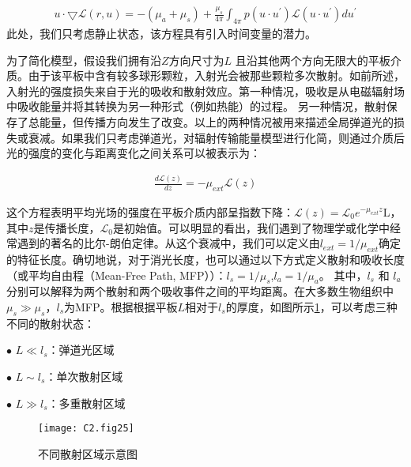 \begin{equation}
\begin{aligned}
    u \cdot \bigtriangledown  \mathcal{L}(r, u) = -(\mu_{a} + \mu_{s})+\frac{\mu_{s}}{4\pi}\int_{4\pi} p(u·u^{\prime}) \mathcal{L}(u·u^{\prime}) d u^{\prime}
\end{aligned}
\label{eq:2.02}
\end{equation}
此处，我们只考虑静止状态，该方程具有引入时间变量的潜力。

为了简化模型，假设我们拥有沿$Z$方向尺寸为$L$ 且沿其他两个方向无限大的平板介质。由于该平板中含有较多球形颗粒，入射光会被那些颗粒多次散射。如前所述，入射光的强度损失来自于光的吸收和散射效应。第一种情况，吸收是从电磁辐射场中吸收能量并将其转换为另一种形式（例如热能）的过程。 另一种情况，散射保存了总能量，但传播方向发生了改变。以上的两种情况被用来描述全局弹道光的损失或衰减。如果我们只考虑弹道光，对辐射传输能量模型进行化简，则通过介质后光的强度的变化与距离变化之间关系可以被表示为：

\begin{equation}
\begin{aligned}
    \frac{d\mathcal{L}(z)}{dz} = -\mu_{ext}\mathcal{L}(z)
\end{aligned}
\label{eq:2.03}
\end{equation}

这个方程表明平均光场的强度在平板介质内部呈指数下降：$\mathcal{L}(z) = \mathcal{L}_{0}e^{-\mu_{ext}z}$L，其中$z$是传播长度，$\mathcal{L}_{0}$是初始值。可以明显的看出，我们遇到了物理学或化学中经常遇到的著名的比尔-朗伯定律。从这个衰减中，我们可以定义由$l_{ext}=1/\mu_{ext}$确定的特征长度。确切地说，对于消光长度，也可以通过以下方式定义散射和吸收长度（或平均自由程（Mean-Free Path, MFP））：$l_{s} = 1/\mu_{s}$,$l_{a} = 1/\mu_{a}$。
其中，$l_{s}$ 和 $l_{a}$分别可以解释为两个散射和两个吸收事件之间的平均距离。在大多数生物组织中$\mu_{s} \gg \mu_{s}$，$l_{s}$为MFP。根据根据平板$L$相对于$l_{s}$的厚度，如图所示\ref{fig2:25}\cite{ntziachristos_going_2010}，可以考虑三种不同的散射状态\cite{ntziachristos_going_2010}：\par
$\bullet$ $ L \ll l_{s} $：弹道光区域\par
$\bullet$ $L \sim l_{s} $：单次散射区域\par
$\bullet$ $L \gg l_{s} $：多重散射区域\par

\begin{figure}[htp]
	\centering
	\texttt{[image: C2.fig25]}
	\caption{不同散射区域示意图}
	\label{fig2:25}
\end{figure}

